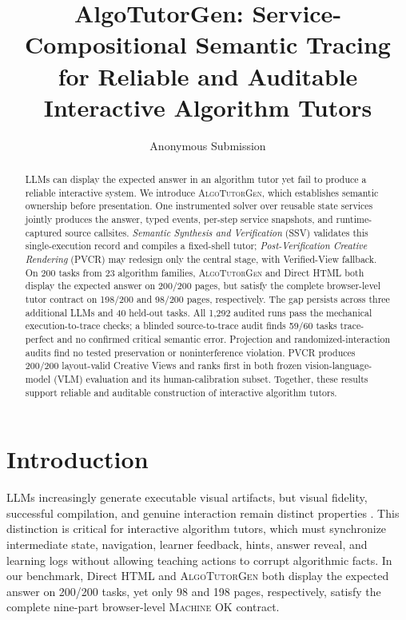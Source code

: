 \documentclass[letterpaper]{article}
\newcommand{\system}{\textsc{AlgoTutorGen}}
\newcommand{\machineok}{\textsc{Machine OK}}
\newcommand{\ssv}{\textsc{SSV}}
\newcommand{\pvcr}{\textsc{PVCR}}
\begin{document}
\title{AlgoTutorGen: Service-Compositional Semantic Tracing for Reliable and Auditable Interactive Algorithm Tutors}
\author{Anonymous Submission}
\affiliations{}

\maketitle

\begin{abstract}
LLMs can display the expected answer in an algorithm tutor yet fail to
produce a reliable interactive system. We introduce \system{}, which
establishes semantic ownership before presentation. One instrumented
solver over reusable state services jointly produces the answer, typed
events, per-step service snapshots, and runtime-captured source
callsites.
\emph{Semantic Synthesis and Verification} (\ssv{}) validates this
single-execution record and compiles a fixed-shell tutor;
\emph{Post-Verification Creative Rendering} (\pvcr{}) may redesign only
the central stage, with Verified-View fallback. On 200 tasks from 23
algorithm families, \system{} and Direct HTML both display the expected
answer on 200/200 pages, but satisfy the complete browser-level tutor
contract on 198/200 and 98/200 pages, respectively. The gap persists
across three additional LLMs and 40 held-out tasks. All 1,292 audited
runs pass the mechanical execution-to-trace checks; a blinded
source-to-trace audit finds 59/60 tasks trace-perfect and no confirmed
critical semantic error. Projection and randomized-interaction audits
find no tested preservation or noninterference violation. \pvcr{}
produces 200/200 layout-valid Creative Views and ranks first in both
frozen vision-language-model (VLM) evaluation and its human-calibration
subset. Together, these results support reliable and auditable
construction of interactive algorithm tutors.
\end{abstract}

\section{Introduction}
\label{sec:introduction}

LLMs increasingly generate executable visual artifacts, but visual
fidelity, successful compilation, and genuine interaction remain
distinct properties
\citep{si2025design2code,lu2025webgenbench,dai2026iwebgenbench}.
This distinction is critical for interactive algorithm tutors, which
must synchronize intermediate state, navigation, learner feedback,
hints, answer reveal, and learning logs without allowing teaching
actions to corrupt algorithmic facts. In our benchmark, Direct HTML and
\system{} both display the expected answer on 200/200 tasks, yet only
98 and 198 pages, respectively, satisfy the complete nine-part
browser-level \machineok{} contract.
\end{document}

